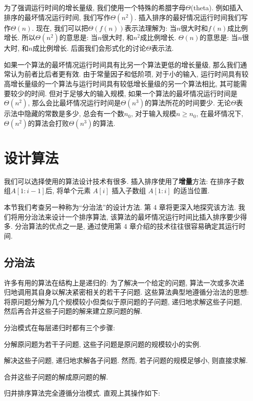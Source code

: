 \documentclass[oneside,10pt,fontset=none]{ctexbook}
\numberwithin{definition}{chapter}
\numberwithin{theorem}{chapter}
\numberwithin{proof}{chapter}
\begin{document}
为了强调运行时间的增长量级, 我们使用一个特殊的希腊字母$\Theta$(theta). 例如插入排序的最坏情况运行时间, 我们写作$\Theta(n^2)$. 插入排序的最好情况运行时间我们写作$\Theta(n)$. 现在, 我们可以把$\Theta(f(n))$表示法理解为: 当$n$很大时和$f(n)$成比例增长. 所以$\Theta(n^2)$的意思是: 当$n$很大时, 和$n^2$成比例增长. $\Theta(n)$的意思是: 当$n$很大时, 和$n$成比例增长. 后面我们会形式化的讨论$\Theta$表示法.

如果一个算法的最坏情况运行时间具有比另一个算法更低的增长量级, 那么我们通常认为前者比后者更有效. 由于常量因子和低阶项, 对于小的输入, 运行时间具有较高增长量级的一个算法与运行时间具有较低增长量级的另一个算法相比, 其可能需要较少的时间. 但对于足够大的输入规模, 如果一个算法的最坏情况运行时间是$\Theta(n^2)$, 那么会比最坏情况运行时间是$\Theta(n^3)$的算法所花的时间要少. 无论$\Theta$表示法中隐藏的常数是多少, 总会有一个数$n_0$, 对于输入规模$n\geq n_0$, 在最坏情况下, $\Theta(n^2)$的算法会打败$\Theta(n^3)$的算法.

\section{设计算法}

我们可以选择使用的算法设计技术有很多. 插入排序使用了\textbf{增量}方法: 在排序子数组$A[1:i-1]$后, 将单个元素 $A[i]$ 插入子数组 $A[1:i]$ 的适当位置.

本节我们考查另一种称为``分治法''的设计方法. 第 4 章将更深入地探究该方法. 我们将用分治法来设计一个排序算法, 该算法的最坏情况运行时间比插入排序要少得多. 分治算法的优点之一是, 通过使用第 4 章介绍的技术往往很容易确定其运行时间.

\subsection{分治法}

许多有用的算法在结构上是递归的: 为了解决一个给定的问题, 算法一次或多次递归地调用其自身以解决紧密相关的若干子问题. 这些算法典型地遵循分治法的思想: 将原问题分解为几个规模较小但类似于原问题的子问题, 递归地求解这些子问题, 然后再合并这些子问题的解来建立原问题的解.

分治模式在每层递归时都有三个步骤:

分解原问题为若干子问题, 这些子问题是原问题的规模较小的实例.

解决这些子问题, 递归地求解各子问题. 然而, 若子问题的规模足够小, 则直接求解.

合并这些子问题的解成原问题的解.

归井排序算法完全遵循分治模式. 直观上其操作如下:
\end{document}
